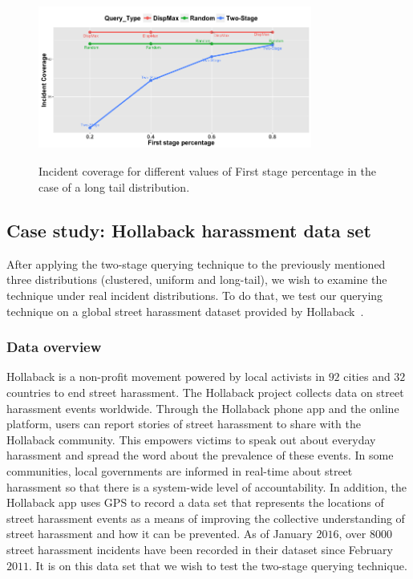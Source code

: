 \documentclass{acm_proc_article-sp}
\begin{document}
\begin{figure}[!h]
\centering
\includegraphics[width=9cm ,height=5.5cm]{figuresPng/LT-incidCov.png}
\caption{Incident coverage for different values of First stage percentage in the case of a long tail distribution. }
\label{fig:LTIncdCove}
\end{figure}
\subsection{Case study: Hollaback harassment data set}
After applying the two-stage querying technique to the previously mentioned three distributions (clustered, uniform and long-tail), we wish to examine the technique under real incident distributions. To do that, we test our querying technique on a global street harassment dataset provided by Hollaback~\cite{hollaback}.
\subsubsection{Data overview}
Hollaback is a non-profit movement powered by local activists in $92$ cities and $32$ countries to end street harassment. The Hollaback project collects data on street harassment events worldwide. Through the Hollaback phone app and the online platform, users can report stories of street harassment to share with the Hollaback community. This empowers victims to speak out about everyday harassment and spread the word about the prevalence of these events. In some communities, local governments are informed in real-time about street harassment so that there is a system-wide level of accountability. In addition, the Hollaback app uses GPS to record a data set that represents the locations of street harassment events as a means of improving the collective understanding of street harassment and how it can be prevented.  As of January $2016$, over $8000$ street harassment incidents have been recorded in their dataset since February $2011$.  It is on this data set that we wish to test the two-stage querying technique.\par
\end{document}
